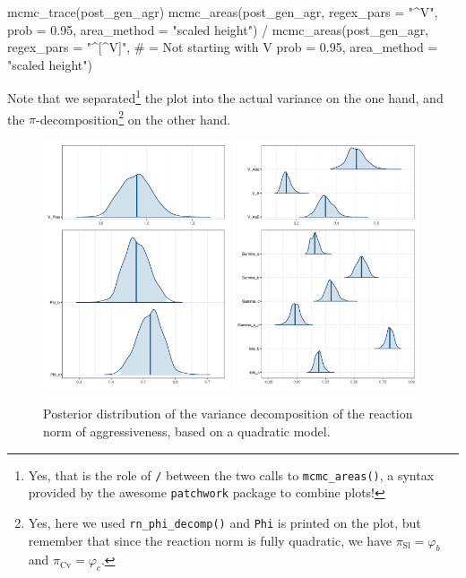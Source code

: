\documentclass[a4paper,12pt,twoside]{article}
\begin{document}
\begin{Rinput}
mcmc_trace(post_gen_agr)
mcmc_areas(post_gen_agr,
           regex_pars = "^V",
           prob = 0.95,
           area_method = "scaled height") /
    mcmc_areas(post_gen_agr,
               regex_pars = "^[^V]",           # = Not starting with V
               prob = 0.95,
               area_method = "scaled height")
\end{Rinput}
Note that we separated\footnote{Yes, that is the role of \texttt{/} between the two calls to \texttt{mcmc\_areas()}, a syntax provided by the awesome \texttt{patchwork} package to combine plots!} the plot into the actual variance on the one hand, and the $\pi$-decomposition\footnote{Yes, here we used \texttt{rn\_phi\_decomp()} and \texttt{Phi} is printed on the plot, but remember that since the reaction norm is fully quadratic, we have $\pi_{\text{Sl}} = \varphi_b$ and $\pi_{\text{Cv}} = \varphi_c$.} on the other hand.


\begin{figure}
  \includegraphics[width = 0.49\textwidth]{Aggressiveness_plas_ds.pdf}
  \includegraphics[width = 0.49\textwidth]{Aggressiveness_gen_ds.pdf}
  \caption{Posterior distribution of the variance decomposition of the reaction norm of aggressiveness, based on a quadratic model.}
  \label{fig_agr_var_decomp_ds}
\end{figure}
\end{document}
